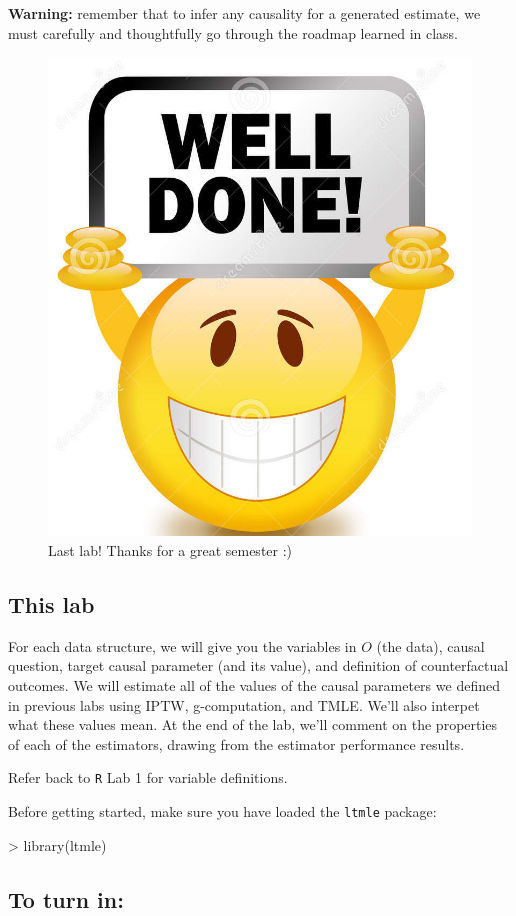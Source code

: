 \documentclass{exam}
\begin{document}
\noindent \textbf{Warning:} remember that to infer any causality for a generated estimate, we must carefully and thoughtfully go through the roadmap learned in class. 

\begin{figure}
\begin{center}
\includegraphics[width=.15\textwidth]{welldone.png}
\caption{Last lab! Thanks for a great semester :)}
\end{center}
\end{figure}

\subsection{This lab}
For each data structure, we will give you the	variables in $O$ (the data), causal question, target causal parameter (and its value), and definition of counterfactual outcomes. We will estimate all of the values of the causal parameters we defined in previous labs using IPTW, g-computation, and TMLE. We'll also interpet what these values mean. At the end of the lab, we'll comment on the properties of each of the estimators, drawing from the estimator performance results.

\noindent Refer back to \texttt{R} Lab 1 for variable definitions.

\noindent Before getting started, make sure you have loaded the \texttt{ltmle} package:
\begin{Schunk}
\begin{Sinput}
> library(ltmle)
\end{Sinput}
\end{Schunk}

\subsection{To turn in:}


\noindent{}
\end{document}

